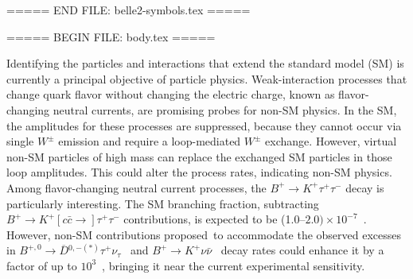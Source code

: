 \def\evtgen   {\mbox{\textsc{EvtGen}}\xspace}
\def\pythia    {\mbox{\textsc{Pythia8}}\xspace}
\def\kkmc     {\mbox{\textsc{KKMC}}\xspace}
\def\geant     {\mbox{\textsc{Geant4}}\xspace}
\def\photos   {\mbox{\textsc{Photos}}\xspace}
\def\tauola    {\mbox{\textsc{TAUOLA}}\xspace}
\def\root       {\mbox{\textsc{Root}}\xspace}
\def\roofit     {\mbox{\textsc{RooFit}}\xspace}
\def\pyroot   {\mbox{\textsc{PyRoot}}\xspace}


\def\cpp        {\mbox{\textsc{C\raisebox{0.1em}{{\footnotesize{++}}}}}\xspace}
\def\python     {\mbox{\textsc{Python}}\xspace}
\def\ruby       {\mbox{\textsc{Ruby}}\xspace}
\def\fortran    {\mbox{\textsc{Fortran}}\xspace}




\newcommand{\eg}{\mbox{\itshape e.g.}\xspace}
\newcommand{\ie}{\mbox{\itshape i.e.}}
\newcommand{\etal}{{\slshape et al.}\xspace}
\newcommand{\etc}{\mbox{\itshape etc.}\xspace}
\newcommand{\cf}{\mbox{\itshape cf.}\xspace}
\newcommand{\ffp}{\mbox{\itshape ff.}\xspace}
\newcommand{\vs}{\mbox{\itshape vs.}\xspace}
===== END FILE: belle2-symbols.tex =====

===== BEGIN FILE: body.tex =====


Identifying the particles and interactions that extend the standard model (SM) is currently a principal objective of particle physics.
Weak-interaction processes that change quark flavor without changing the electric charge, known as flavor-changing neutral currents, are promising probes for non-SM physics. In the SM, the amplitudes for these processes are suppressed, because they cannot occur via single $W^\pm$ emission and require a loop-mediated $W^\pm$ exchange. However, virtual non-SM particles of high mass can replace the exchanged SM particles in those loop amplitudes. This could alter the process rates, indicating non-SM physics.  Among flavor-changing neutral current processes, the $B^+ \to K^+\tau^+\tau^-$ decay is particularly interesting. The SM branching fraction, subtracting $B^+ \to K^+[c\bar{c}\to]\tau^+\tau^-$ contributions, is expected to be (1.0--$2.0) \times 10^{-7}$~\cite{Bouchard:2013mia, hewitt, Parrott:2022zte}. However, non-SM contributions proposed~to accommodate the observed excesses in $B^{+,0} \to \overline{D}{}^{0,-(*)} \tau^+  \nu_\tau$~\cite{HeavyFlavorAveragingGroupHFLAV:2024ctg} and $B^{+} \to K^{+} \nu \bar{\nu}$~\cite{Belle-II:2023esi} decay rates could enhance it by a factor of up to $10^3$~\cite{Alonso:2015sja, Barbieri:2015yvd, Capdevila:2017iqn, Kumar:2018kmr,Allwicher:2023xba}, bringing it near the current experimental sensitivity.












